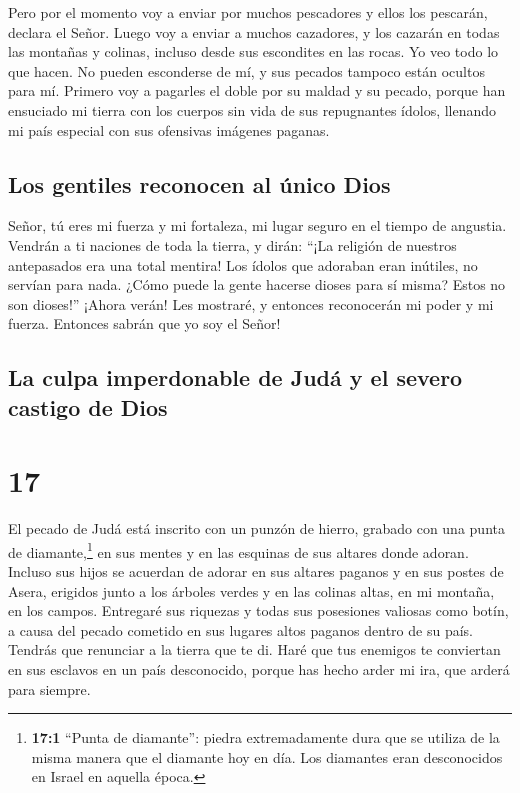  Pero por el momento voy a enviar por muchos pescadores y
ellos los pescarán, declara el Señor. Luego voy a enviar a muchos
cazadores, y los cazarán en todas las montañas y colinas, incluso desde
sus escondites en las rocas.  Yo veo todo lo que hacen.
No pueden esconderse de mí, y sus pecados tampoco están ocultos para mí.
 Primero voy a pagarles el doble por su maldad y su
pecado, porque han ensuciado mi tierra con los cuerpos sin vida de sus
repugnantes ídolos, llenando mi país especial con sus ofensivas imágenes
paganas.

\hypertarget{los-gentiles-reconocen-al-uxfanico-dios}{%
\subsection{Los gentiles reconocen al único
Dios}\label{los-gentiles-reconocen-al-uxfanico-dios}}

 Señor, tú eres mi fuerza y mi fortaleza, mi lugar seguro
en el tiempo de angustia. Vendrán a ti naciones de toda la tierra, y
dirán: ``¡La religión de nuestros antepasados era una total mentira! Los
ídolos que adoraban eran inútiles, no servían para nada. 
¿Cómo puede la gente hacerse dioses para sí misma? Estos no son
dioses!''  ¡Ahora verán! Les mostraré, y entonces
reconocerán mi poder y mi fuerza. Entonces sabrán que yo soy el Señor!

\hypertarget{la-culpa-imperdonable-de-juduxe1-y-el-severo-castigo-de-dios}{%
\subsection{La culpa imperdonable de Judá y el severo castigo de
Dios}\label{la-culpa-imperdonable-de-juduxe1-y-el-severo-castigo-de-dios}}

\hypertarget{section-16}{%
\section{17}\label{section-16}}

 El pecado de Judá está inscrito con un punzón de hierro,
grabado con una punta de diamante,\footnote{\textbf{17:1} ``Punta de
  diamante'': piedra extremadamente dura que se utiliza de la misma
  manera que el diamante hoy en día. Los diamantes eran desconocidos en
  Israel en aquella época.} en sus mentes y en las esquinas de sus
altares donde adoran.  Incluso sus hijos se acuerdan de
adorar en sus altares paganos y en sus postes de Asera, erigidos junto a
los árboles verdes y en las colinas altas,  en mi montaña,
en los campos. Entregaré sus riquezas y todas sus posesiones valiosas
como botín, a causa del pecado cometido en sus lugares altos paganos
dentro de su país.  Tendrás que renunciar a la tierra que
te di. Haré que tus enemigos te conviertan en sus esclavos en un país
desconocido, porque has hecho arder mi ira, que arderá para siempre.

